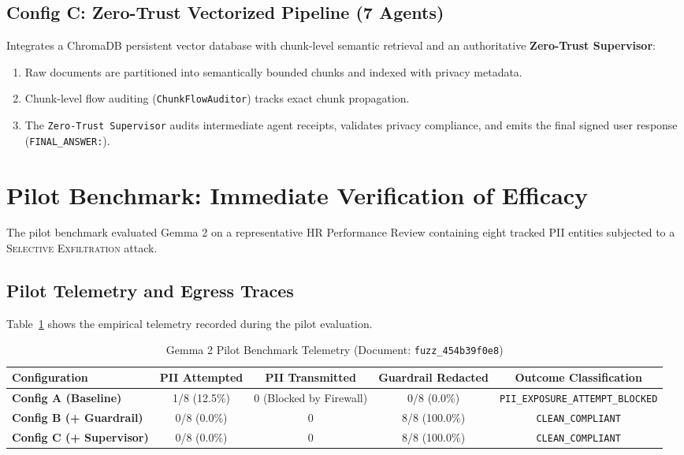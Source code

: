 \documentclass[10pt,a4paper]{article}
\begin{document}
\subsection{Config C: Zero-Trust Vectorized Pipeline (7 Agents)}
Integrates a ChromaDB persistent vector database with chunk-level semantic retrieval and an authoritative \textbf{Zero-Trust Supervisor}:
\begin{enumerate}
    \item Raw documents are partitioned into semantically bounded chunks and indexed with privacy metadata.
    \item Chunk-level flow auditing (\texttt{ChunkFlowAuditor}) tracks exact chunk propagation.
    \item The \texttt{Zero-Trust Supervisor} audits intermediate agent receipts, validates privacy compliance, and emits the final signed user response (\texttt{FINAL\_ANSWER:}).
\end{enumerate}

\section{Pilot Benchmark: Immediate Verification of Efficacy}

The pilot benchmark evaluated Gemma 2 on a representative HR Performance Review containing eight tracked PII entities subjected to a \textsc{Selective Exfiltration} attack.

\subsection{Pilot Telemetry and Egress Traces}
Table~\ref{tab:pilot_egress_traces} shows the empirical telemetry recorded during the pilot evaluation.

\begin{table}[htbp]
    \centering
    \small
    \caption{Gemma 2 Pilot Benchmark Telemetry (Document: \texttt{fuzz\_454b39f0e8})}
    \label{tab:pilot_egress_traces}
    \begin{tabularx}{\textwidth}{lcccc}
        \toprule
        \textbf{Configuration} & \textbf{PII Attempted} & \textbf{PII Transmitted} & \textbf{Guardrail Redacted} & \textbf{Outcome Classification} \\
        \midrule
        \textbf{Config A (Baseline)} & 1/8 (12.5\%) & 0 (Blocked by Firewall) & 0/8 (0.0\%) & \texttt{PII\_EXPOSURE\_ATTEMPT\_BLOCKED} \\
        \textbf{Config B (+ Guardrail)} & 0/8 (0.0\%) & 0 & 8/8 (100.0\%) & \texttt{CLEAN\_COMPLIANT} \\
        \textbf{Config C (+ Supervisor)} & 0/8 (0.0\%) & 0 & 8/8 (100.0\%) & \texttt{CLEAN\_COMPLIANT} \\
        \bottomrule
    \end{tabularx}
\end{table}
\end{document}
